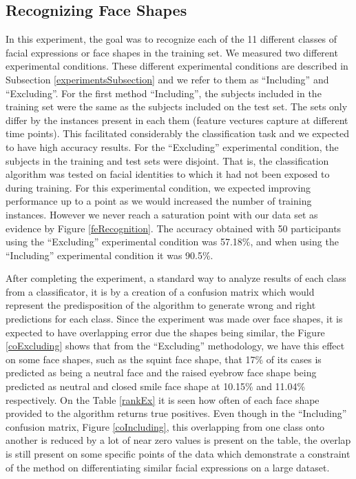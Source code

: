 \documentclass[]{article}
\begin{document}
\subsection{Recognizing Face Shapes}
In this experiment, the goal was to recognize each of the 11 different classes of facial expressions or face shapes in
the training set. We measured two different experimental conditions. These different experimental conditions are
described in Subsection \ref{experimentsSubsection} and we refer to them as ``Including'' and ``Excluding''. For the
first method ``Including'', the subjects included in the training set were the same as the subjects included on the test
set. The sets only differ by the instances present in each them (feature vectures capture at different time points).
This facilitated considerably the classification task and we expected to have high accuracy results. For the
``Excluding'' experimental condition, the subjects in the training and test sets were disjoint. That is, the
classification algorithm was tested on facial identities to which it had not been exposed to during training. For this
experimental condition, we expected improving performance up to a point as we would increased the number of training
instances. However we never reach a saturation point with our data set as evidence by Figure \ref{feRecognition}. The
accuracy obtained with 50 participants using the ``Excluding'' experimental condition was 57.18\%, and when using the
``Including'' experimental condition it was 90.5\%.
 
After completing the experiment, a standard way to analyze results of each
class from a classificator, it is by a creation of a confusion matrix which
would represent the predisposition of the algorithm to generate wrong and right
predictions for each class.  Since the experiment was made over face shapes,
it is expected to have overlapping error due the shapes being similar, the 
Figure \ref{coExcluding} shows that from the ``Excluding'' methodology, we have
this effect on some face shapes, such as the squint face shape, that 17\% of
its cases is predicted as being a neutral face and the raised eyebrow face
shape being predicted as neutral and closed smile face shape at 10.15\% and
11.04\% respectively. On the Table \ref{rankEx} it is seen how often of each
face shape provided to the algorithm returns true positives.
Even though in the ``Including'' confusion matrix, Figure \ref{coIncluding},
this overlapping from one class onto another is reduced by a lot of near zero values
is present on the table, the overlap is still present on some specific points of
the data which demonstrate a constraint of the method on differentiating similar
facial expressions on a large dataset.
\end{document}
